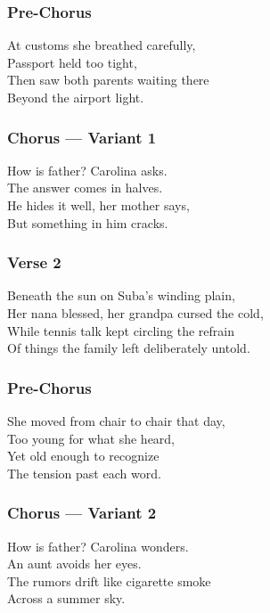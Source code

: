 \subsubsection{Pre-Chorus}\label{pre-chorus-18}

At customs she breathed carefully,\\
Passport held too tight,\\
Then saw both parents waiting there\\
Beyond the airport light.

\subsubsection{Chorus --- Variant 1}\label{chorus-variant-1}

How is father? Carolina asks.\\
The answer comes in halves.\\
He hides it well, her mother says,\\
But something in him cracks.

\subsubsection{Verse 2}\label{verse-2-14}

Beneath the sun on Suba's winding plain,\\
Her nana blessed, her grandpa cursed the cold,\\
While tennis talk kept circling the refrain\\
Of things the family left deliberately untold.

\subsubsection{Pre-Chorus}\label{pre-chorus-19}

She moved from chair to chair that day,\\
Too young for what she heard,\\
Yet old enough to recognize\\
The tension past each word.

\subsubsection{Chorus --- Variant 2}\label{chorus-variant-2}

How is father? Carolina wonders.\\
An aunt avoids her eyes.\\
The rumors drift like cigarette smoke\\
Across a summer sky.

